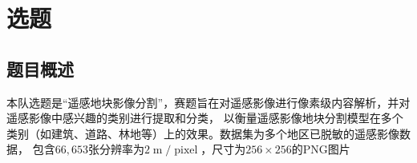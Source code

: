 \documentclass[a4paper,twoside,zihao=5,UTF8]{ctexrep}
\title{\BookTitle}
\subtitle{\BookSubtitle}
\author{\Authors}
\date{\Date}
\begin{document}
\maketitle
\thispagestyle{empty}

\tableofcontents 
\thispagestyle{empty}

\clearpage
\setcounter{page}{1}

\part{选题}
\chapter{题目概述}
本队选题是“遥感地块影像分割”，赛题旨在对遥感影像进行像素级内容解析，并对遥感影像中感兴趣的类别进行提取和分类，
以衡量遥感影像地块分割模型在多个类别（如建筑、道路、林地等）上的效果。数据集为多个地区已脱敏的遥感影像数据，
包含$66,653$张分辨率为$2\mathop{m}/\mathop{pixel}$，尺寸为$256 \times 256$的PNG图片
\end{document}
